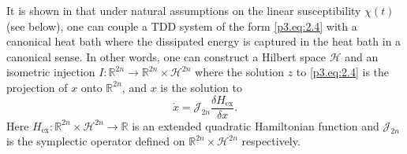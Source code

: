 It is shown in \cite{figotin2007hamiltonian,figotin2005spectral} that under natural assumptions on the linear susceptibility $\chi(t)$ (see below), one can couple a TDD system of the form \eqref{p3.eq:2.4} with a canonical heat bath where the dissipated energy is captured in the heat bath in a canonical sense. In other words, one can construct a Hilbert space $\mathcal H$ and an isometric injection $I:\mathbb R^{2n} \to \mathbb R^{2n}\times \mathcal H^{2n}$ where the solution $z$ to \eqref{p3.eq:2.4} is the projection of $x$ onto $\mathbb R^{2n}$, and $x$ is the solution to
\begin{equation} \label{p3.eq:2.7}
	\dot x = \mathcal J_{2n} \frac{\delta H_{\text{ex}}}{\delta x}.
\end{equation}
Here $H_{\text{ex}}:\mathbb R^{2n}\times \mathcal H^{2n} \to \mathbb R$ is an extended quadratic Hamiltonian function and $\mathcal J_{2n}$ is the symplectic operator defined on $\mathbb R^{2n}\times \mathcal H^{2n}$ respectively.


